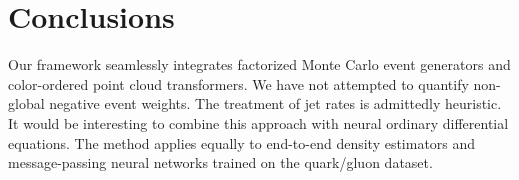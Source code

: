 \section{Conclusions}\label{sec:conclusions}

Our framework seamlessly integrates factorized Monte Carlo event
generators and color-ordered point cloud transformers. We have not
attempted to quantify non-global negative event weights. The treatment
of jet rates is admittedly heuristic. It would be interesting to combine
this approach with neural ordinary differential equations. The method
applies equally to end-to-end density estimators and message-passing
neural networks trained on the quark/gluon dataset.

